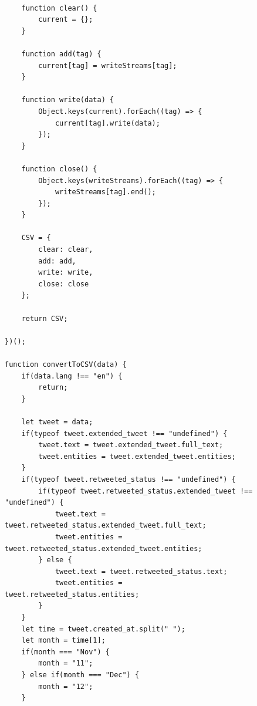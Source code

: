 \documentclass[prodmode]{acmsmall} %
\begin{document}
\begin{figure}[!t]
    \begin{lstlisting}

    function clear() {
        current = {};
    }

    function add(tag) {
        current[tag] = writeStreams[tag];
    }

    function write(data) {
        Object.keys(current).forEach((tag) => {
            current[tag].write(data);
        });
    }

    function close() {
        Object.keys(writeStreams).forEach((tag) => {
            writeStreams[tag].end();
        });
    }

    CSV = {
        clear: clear,
        add: add,
        write: write,
        close: close
    };

    return CSV;

})();

function convertToCSV(data) {
    if(data.lang !== "en") {
        return;
    }

    let tweet = data;
    if(typeof tweet.extended_tweet !== "undefined") {
        tweet.text = tweet.extended_tweet.full_text;
        tweet.entities = tweet.extended_tweet.entities;
    }
    if(typeof tweet.retweeted_status !== "undefined") {
        if(typeof tweet.retweeted_status.extended_tweet !== "undefined") {
            tweet.text = tweet.retweeted_status.extended_tweet.full_text;
            tweet.entities = tweet.retweeted_status.extended_tweet.entities;
        } else {
            tweet.text = tweet.retweeted_status.text;
            tweet.entities = tweet.retweeted_status.entities;
        }
    }
    let time = tweet.created_at.split(" ");
    let month = time[1];
    if(month === "Nov") {
        month = "11";
    } else if(month === "Dec") {
        month = "12";
    }
    

\end{lstlisting}
  \end{figure}
\end{document}
